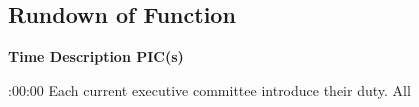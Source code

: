 \subsection{Rundown of Function}

\setupTABLE[c][1][width=1.25in]
\setupTABLE[c][2][width=3.5in]
\setupTABLE[c][3][width=1.25in]
\bTABLE
\bTABLEhead

\bTR\bTH    \bf{Time}
\eTH\bTH    \bf{Description}
\eTH\bTH    \bf{PIC(s)}
\eTH\eTR

\eTABLEhead
\bTABLEbody

\bTR{}:00:00
\eTD\bTD Each current executive committee introduce their duty.
\eTD\bTD All
\eTD\eTR

\eTABLEbody
\eTABLE

\stopsection
\pagebreak
